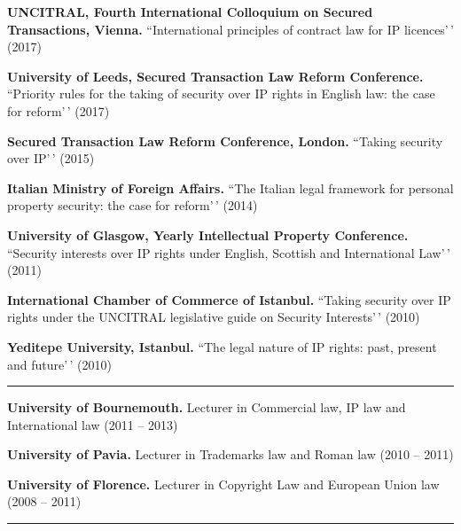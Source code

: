\documentclass[
  11pt,
  letterpaper]{article}
\begin{document}
\vspace{0.8em}\noindent\textbf{UNCITRAL, Fourth International Colloquium on Secured Transactions, Vienna.}
``International principles of contract law for IP licences'\,' (2017)

\vspace{0.8em}\noindent\textbf{University of Leeds, Secured Transaction Law Reform Conference.}
``Priority rules for the taking of security over IP rights in English
law: the case for reform'\,' (2017)

\vspace{0.8em}\noindent\textbf{Secured Transaction Law Reform Conference, London.}
``Taking security over IP'\,' (2015)

\vspace{0.8em}\noindent\textbf{Italian Ministry of Foreign Affairs.}
``The Italian legal framework for personal property security: the case
for reform'\,' (2014)

\vspace{0.8em}\noindent\textbf{University of Glasgow, Yearly Intellectual Property Conference.}
``Security interests over IP rights under English, Scottish and
International Law'\,' (2011)

\vspace{0.8em}\noindent\textbf{International Chamber of Commerce of Istanbul.}
``Taking security over IP rights under the UNCITRAL legislative guide on
Security Interests'\,' (2010)

\vspace{0.8em}\noindent\textbf{Yeditepe University, Istanbul.} ``The
legal nature of IP rights: past, present and future'\,' (2010)

\vspace{0.25em}\hrule\vspace{0.7em}

\noindent\textbf{University of Bournemouth.} Lecturer in Commercial law,
IP law and International law (2011 -- 2013)

\vspace{0.8em}\noindent\textbf{University of Pavia.} Lecturer in
Trademarks law and Roman law (2010 -- 2011)

\vspace{0.8em}\noindent\textbf{University of Florence.} Lecturer in
Copyright Law and European Union law (2008 -- 2011)

\vspace{0.25em}\hrule\vspace{0.7em}
\end{document}
